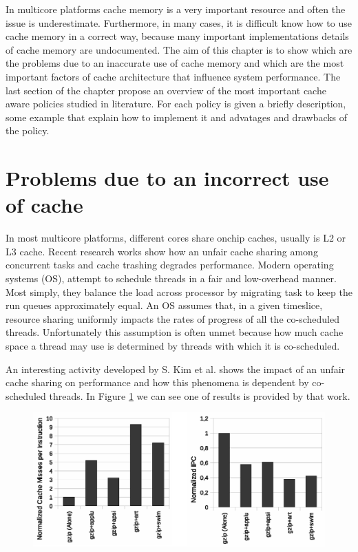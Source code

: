 In multicore platforms cache memory is a very important resource and often the issue is underestimate. Furthermore, in many cases, it is difficult know 
how to use cache memory in a correct way, because many important implementations details of cache memory are undocumented. The aim of this chapter is 
to show which are the problems due to an inaccurate use of cache memory and which are the most important factors of cache architecture that influence 
system performance. The last section of the chapter propose an overview of the most important cache aware policies studied in literature. For each policy 
is given a briefly description, some example that explain how to implement it and advatages and drawbacks of the policy.

\section{Problems due to an incorrect use of cache}
\label{sec:s1}

In most multicore platforms, different cores share onchip caches, usually is L2 or L3 cache. Recent research works show how an unfair cache sharing
among concurrent tasks and cache trashing degrades performance. Modern operating systems (OS), attempt to schedule threads in a
fair and low-overhead manner.
Most simply, they balance the load across processor by migrating task to keep the run queues approximately equal. An OS assumes that,
in a given timeslice, resource sharing uniformly impacts the rates of progress of all the co-scheduled threads.
Unfortunately this assumption is often unmet because how much cache space a thread may use is determined by threads with which it is co-scheduled.

An interesting activity developed by S. Kim et al. shows the impact of an unfair cache sharing on performance and how this phenomena is dependent by
co-scheduled threads. In Figure \ref{fig:gzip_miss} we can see one of results is provided by that work.

\begin{figure}[htbp]
\centering
\includegraphics[width=\widefigure]{images/chandra_gzip}
\caption{}
\label{fig:gzip_miss}
\end{figure}

